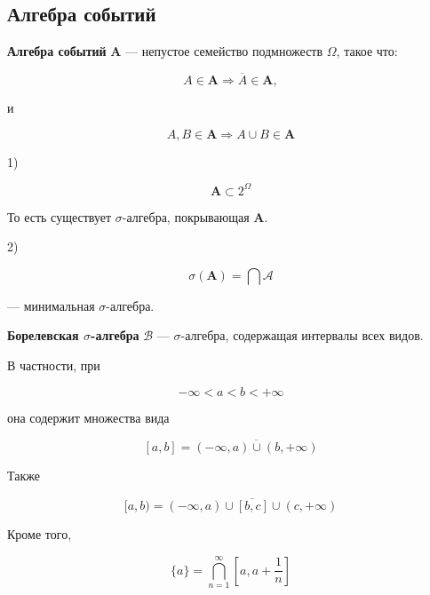 \documentclass[12pt,a4paper]{article}
\begin{document}
\subsection{Алгебра событий}

\begin{definition}

\textbf{Алгебра событий} $\mathbf{A}$ — непустое семейство подмножеств $\Omega$, такое что:

\[
A\in\mathbf{A}
\Longrightarrow
\overline{A}\in\mathbf{A},
\]

и

\[
A,B\in\mathbf{A}
\Longrightarrow
A\cup B\in\mathbf{A}
\]

\end{definition}


\begin{note}

1)

\[
\mathbf{A}\subset2^\Omega
\]

То есть существует $\sigma$-алгебра, покрывающая $\mathbf{A}$.


\medskip

2)

\[
\sigma(\mathbf{A})
=
\bigcap\mathcal{A}
\]

— минимальная $\sigma$-алгебра.

\end{note}


\begin{definition}

\textbf{Борелевская $\sigma$-алгебра} $\mathcal{B}$ — $\sigma$-алгебра, содержащая интервалы всех видов.

В частности, при

\[
-\infty<a<b<+\infty
\]

она содержит множества вида

\[
[a,b]
=
\overline{
(-\infty,a)\cup(b,+\infty)
}
\]

Также

\[
[a,b)
=
\overline{
(-\infty,a)\cup[b,c]\cup(c,+\infty)
}
\]

Кроме того,

\[
\{a\}
=
\bigcap_{n=1}^{\infty}
\left[a,a+\frac1n\right]
\]

\end{definition}
\end{document}
